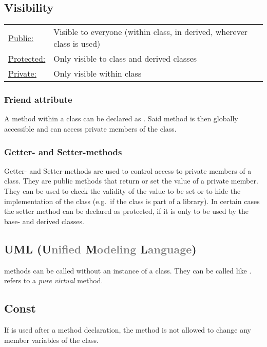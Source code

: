 \subsection{Visibility}
    \begin{tabularx}{\columnwidth}{@{}l X@{}}
        \underline{Public:}       & Visible to everyone (within class, in derived, wherever class is used)\\
        \underline{Protected:}    & Only visible to class and derived classes\\
        \underline{Private:}      & Only visible within class
    \end{tabularx}
    
    \subsubsection{Friend attribute}
    A method within a class can be declared as . Said method is then globally accessible and can access private members of the class.

    \subsubsection{Getter- and Setter-methods}
    Getter- and Setter-methods are used to control access to private members of a class. 
    They are public methods that return or set the value of a private member. 
    They can be used to check the validity of the value to be set or to hide the implementation of the class (e.g.\ if the class is part of a library).
    In certain cases the setter method can be declared as protected, if it is only to be used by the base- and derived classes.

    \subsection{UML (U\textcolor{gray}{nified} M\textcolor{gray}{odeling} L\textcolor{gray}{anguage})}
    \begin{center}
        
    \end{center}
    \vspace{-3mm}
     methods can be called without an instance of a class. They can be called like .  refers to a \textit{pure virtual} method.
    
\subsection{Const}
    If  is used after a method declaration, the method is not allowed to change any member variables of the class.

